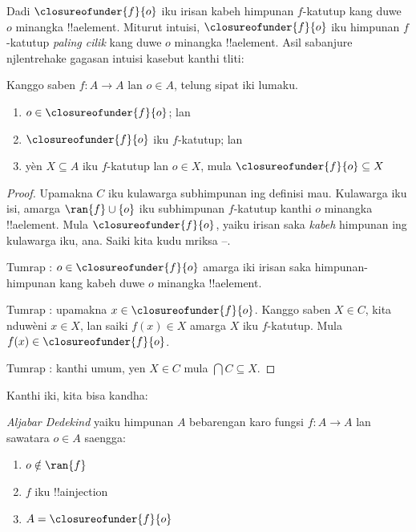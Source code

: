 \documentclass[../../../include/open-logic-section]{subfiles}
\begin{document}
Dadi $\closureofunder{f}{o}$ iku irisan kabeh himpunan $f$-katutup
kang duwe $o$ minangka !!a{element}. Miturut intuisi,
$\closureofunder{f}{o}$ iku himpunan $f$-katutup \emph{paling cilik}
kang duwe $o$ minangka !!a{element}. Asil sabanjure njlentrehake
gagasan intuisi kasebut kanthi tliti:
\begin{lem}
	Kanggo saben $f\colon A\to A$ lan $o \in A$, telung sipat iki lumaku.
	\begin{enumerate}
		\item{} $o \in \closureofunder{f}{o}$; lan
		\item{} $\closureofunder{f}{o}$ iku $f$-katutup; lan
		\item{} yèn $X\subseteq A$ iku $f$-katutup lan $o \in
		X$, mula $\closureofunder{f}{o} \subseteq X$
	\end{enumerate}
\end{lem}

\begin{proof}
Upamakna $C$ iku kulawarga subhimpunan ing definisi mau.
Kulawarga iku isi, amarga $\ran{f}\cup \{o\}$ iku subhimpunan
$f$-katutup kanthi $o$ minangka !!a{element}. Mula
$\closureofunder{f}{o}$, yaiku irisan saka \emph{kabeh} himpunan
ing kulawarga iku, ana. Saiki kita kudu mriksa
--.

Tumrap : $o \in \closureofunder{f}{o}$ amarga
iki irisan saka himpunan-himpunan kang kabeh duwe $o$ minangka
!!a{element}.

Tumrap : upamakna $x \in \closureofunder{f}{o}$.
Kanggo saben $X\in C$, kita nduwèni $x \in X$, lan saiki
$f(x) \in X$ amarga $X$ iku $f$-katutup. Mula
$f(x) \in \closureofunder{f}{o}$.

Tumrap : kanthi umum, yen $X \in C$ mula
$\bigcap C \subseteq X$.
\end{proof}

Kanthi iki, kita bisa kandha:

\begin{defn}
\emph{Aljabar Dedekind} yaiku himpunan $A$ bebarengan karo fungsi $f
\colon A \to A$ lan sawatara $o \in A$ saengga:
	\begin{enumerate}
		\item {} $o \notin \ran{f}$
		\item {} $f$ iku !!a{injection}
		\item {} $A = \closureofunder{f}{o}$
	\end{enumerate}
\end{defn}
\end{document}

